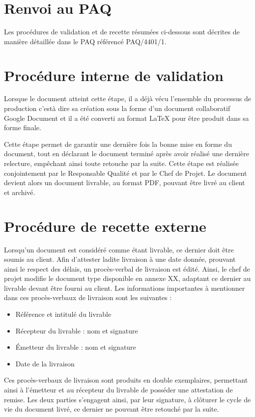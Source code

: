 \section{Renvoi au PAQ}

Les procédures de validation et de recette résumées ci-dessous sont décrites de manière détaillée dans le PAQ référencé PAQ/4401/1.

\section{Procédure interne de validation}

Lorsque le document atteint cette étape, il a déjà vécu l'ensemble du processus de production c'està dire sa création sous la forme d'un document collaboratif Google Document et il a été converti au format LaTeX pour être produit dans sa forme finale. 

Cette étape permet de garantir une dernière fois la bonne mise en forme du document, tout en déclarant le document terminé après avoir réalisé une dernière relecture, empêchant ainsi toute retouche par la suite. Cette étape est réalisée conjointement par le Responsable Qualité et par le Chef de Projet. Le document devient alors un document livrable, au format PDF, pouvant être livré au client et archivé.

\section{Procédure de recette externe}

Lorsqu’un document est considéré comme étant livrable, ce dernier doit être soumis au client. Afin d’attester ladite livraison à une date donnée, prouvant ainsi le respect des délais, un procès-verbal de livraison est édité. Ainsi, le chef de projet modifie le document type disponible en annexe XX, adaptant ce dernier au livrable devant être fourni au client. Les informations importantes à mentionner dans ces procès-verbaux de livraison sont les suivantes : \\

\begin{itemize}
    \item[\textbullet] Référence et intitulé du livrable
    \item[\textbullet] Récepteur du livrable : nom et signature
    \item[\textbullet] Émetteur du livrable : nom et signature
    \item[\textbullet] Date de la livraison \\
\end{itemize}
    
Ces procès-verbaux de livraison sont produits en double exemplaires, permettant ainsi à l’émetteur et au récepteur du livrable de posséder une attestation de remise. Les deux parties s’engagent ainsi, par leur signature, à clôturer le cycle de vie du document livré, ce dernier ne pouvant être retouché par la suite.
